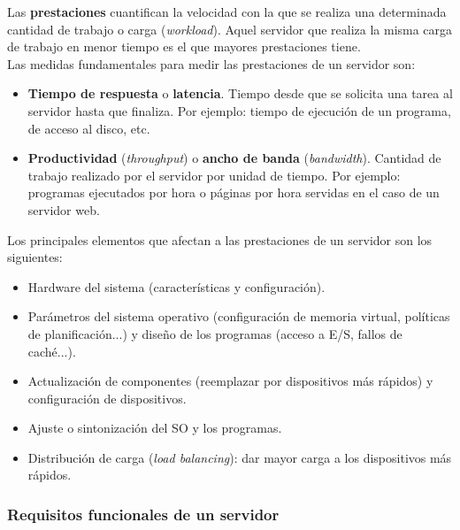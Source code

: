 \documentclass[12pt,spanish]{article}
\begin{document}
Las \textbf{prestaciones} cuantifican la velocidad con la que se realiza una determinada cantidad de trabajo o carga (\textit{workload}). Aquel servidor que realiza la misma carga de trabajo en menor tiempo es el que mayores prestaciones tiene.\\
Las medidas fundamentales para medir las prestaciones de un servidor son:
\begin{itemize}
	\item \textbf{Tiempo de respuesta} o \textbf{latencia}. Tiempo desde que se solicita una tarea al servidor hasta que finaliza. Por ejemplo: tiempo de ejecución de un programa, de acceso al disco, etc.
	\item \textbf{Productividad} (\textit{throughput}) o \textbf{ancho de banda} (\textit{bandwidth}). Cantidad de trabajo realizado por el servidor por unidad de tiempo. Por ejemplo: programas ejecutados por hora o páginas por hora servidas en el caso de un servidor web.
\end{itemize}

Los principales elementos que afectan a las prestaciones de un servidor son los siguientes:
\begin{itemize}
	\item Hardware del sistema (características y configuración).
	\item Parámetros del sistema operativo (configuración de memoria virtual, políticas de planificación...) y diseño de los programas (acceso a E/S, fallos de caché...).
	\item Actualización de componentes (reemplazar por dispositivos más rápidos) y configuración de dispositivos.
	\item Ajuste o sintonización del SO y los programas.
	\item Distribución de carga (\textit{load balancing}): dar mayor carga a los dispositivos más rápidos.
\end{itemize}

\subsubsection{Requisitos funcionales de un servidor}
\end{document}
